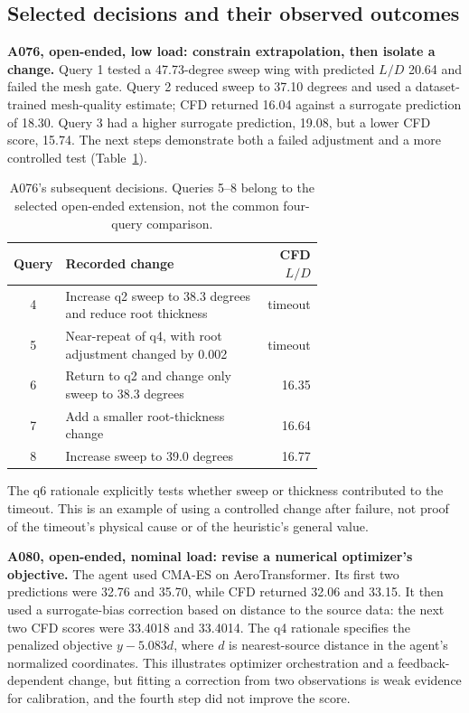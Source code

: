 \subsection{Selected decisions and their observed outcomes}

\textbf{A076, open-ended, low load: constrain extrapolation, then isolate a
change.} Query 1 tested a 47.73-degree sweep wing with predicted $L/D$ 20.64
and failed the mesh gate. Query 2 reduced sweep to 37.10 degrees and used a
dataset-trained mesh-quality estimate; CFD returned 16.04 against a surrogate
prediction of 18.30. Query 3 had a higher surrogate prediction, 19.08, but a
lower CFD score, 15.74. The next steps demonstrate both a failed adjustment
and a more controlled test (Table~\ref{tab:agent-case-a076}).

\begin{table}[htbp]
\centering\small
\caption{A076's subsequent decisions. Queries 5--8 belong to the selected
open-ended extension, not the common four-query comparison.}
\label{tab:agent-case-a076}
\begin{tabular}{cp{0.68\linewidth}r}
\toprule
Query & Recorded change & CFD $L/D$ \\
\midrule
4 & Increase q2 sweep to 38.3 degrees and reduce root thickness & timeout \\
5 & Near-repeat of q4, with root adjustment changed by 0.002 & timeout \\
6 & Return to q2 and change only sweep to 38.3 degrees & 16.35 \\
7 & Add a smaller root-thickness change & 16.64 \\
8 & Increase sweep to 39.0 degrees & 16.77 \\
\bottomrule
\end{tabular}
\end{table}

The q6 rationale explicitly tests whether sweep or thickness contributed to
the timeout. This is an example of using a controlled change after failure,
not proof of the timeout's physical cause or of the heuristic's general value.

\textbf{A080, open-ended, nominal load: revise a numerical optimizer's
objective.} The agent used CMA-ES on AeroTransformer. Its first two predictions
were 32.76 and 35.70, while CFD returned 32.06 and 33.15. It then used a
surrogate-bias correction based on distance to the source data: the next two
CFD scores were 33.4018 and 33.4014. The q4 rationale specifies the penalized
objective $y-5.083d$, where $d$ is nearest-source distance in the agent's
normalized coordinates. This illustrates optimizer orchestration and a
feedback-dependent change, but fitting a correction from two observations is
weak evidence for calibration, and the fourth step did not improve the score.

